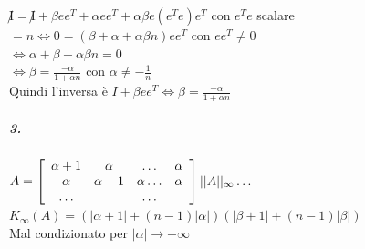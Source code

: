 \documentclass[10pt]{book}
\begin{document}
$\not I = \not I + \beta e e^T + \alpha e e^T + \alpha \beta e(e^Te)e^T $ con $e^Te$ scalare $= n \Leftrightarrow 0 = (\beta + \alpha + \alpha \beta n)e e^T$ con $e e^T \neq 0$\\
$\Leftrightarrow \alpha + \beta + \alpha \beta n = 0$\\
$\Leftrightarrow \beta = \frac{-\alpha}{1 + \alpha n}$ con $\alpha \neq -\frac{1}{n}$\\
Quindi l'inversa è $I + \beta e e^T \Leftrightarrow \beta = \frac{-\alpha}{1 + \alpha n}$
\subparagraph{3.} $A = \left[\begin{array}{c c c c}
	\alpha + 1 & \alpha & \ldots & \alpha\\
	\alpha & \alpha + 1 & \alpha\ldots & \alpha\\
	\ldots & & \ldots &
\end{array}
\right]
||A||_\infty\ldots$\\
$K_\infty(A) = (|\alpha + 1| + (n - 1)|\alpha|)(|\beta + 1| + (n-1)|\beta|)$\\
Mal condizionato per $|\alpha| \rightarrow +\infty$
\end{document}
